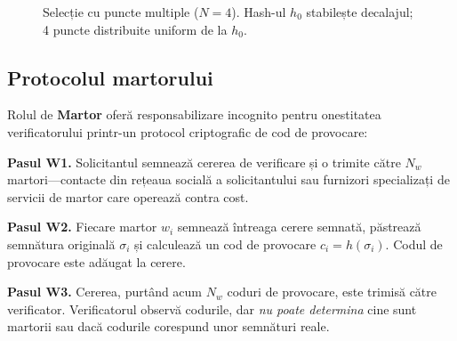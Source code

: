 \documentclass[11pt,a4paper,twocolumn]{article}
\begin{document}
\begin{figure}[ht]
\centering
{}
\caption{Selecție cu puncte multiple ($N{=}4$). Hash-ul $h_0$ stabilește decalajul; 4 puncte distribuite uniform de la $h_0$.}
\label{fig:multipoint}
\end{figure}

\subsection{Protocolul martorului}

Rolul de \textbf{Martor} oferă responsabilizare incognito pentru onestitatea verificatorului printr-un protocol criptografic de cod de provocare:

\textbf{Pasul W1.} Solicitantul semnează cererea de verificare și o trimite către $N_w$ martori---contacte din rețeaua socială a solicitantului sau furnizori specializați de servicii de martor care operează contra cost.

\textbf{Pasul W2.} Fiecare martor $w_i$ semnează întreaga cerere semnată, păstrează semnătura originală $\sigma_i$ și calculează un cod de provocare $c_i = h(\sigma_i)$. Codul de provocare este adăugat la cerere.

\textbf{Pasul W3.} Cererea, purtând acum $N_w$ coduri de provocare, este trimisă către verificator. Verificatorul observă codurile, dar \emph{nu poate determina} cine sunt martorii sau dacă codurile corespund unor semnături reale.
\end{document}
